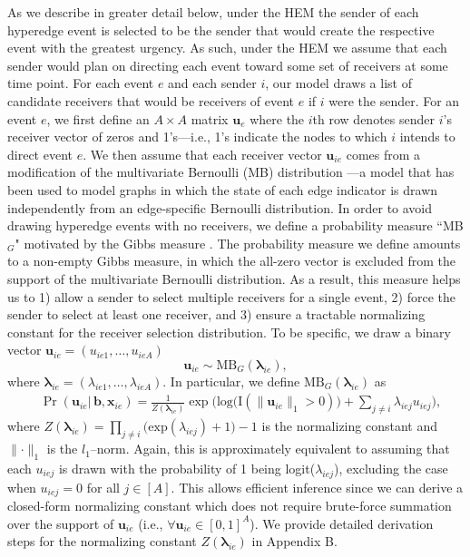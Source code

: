 \documentclass[ba]{imsart}
\numberwithin{equation}{section}
\theoremstyle{plain}
\begin{document}
	As we describe in greater detail below, under the HEM the sender of each hyperedge event is selected to be the sender that would create the respective event with the greatest urgency. As such, under the HEM we assume that each sender would plan on directing each event toward some set of receivers at some time point. For each event $e$ and each sender $i$, our model draws a list of candidate receivers that would be receivers of event $e$ if $i$ were the sender. For an event $e$, we first define an $A\times A$ matrix $\boldsymbol{u}_e$ where the $i$th row denotes sender $i$'s receiver vector of zeros and 1's---i.e., 1's indicate the nodes to which $i$ intends to direct event $e$. We then assume that each receiver vector $\boldsymbol{u}_{ie}$ comes from a modification of the multivariate Bernoulli (MB) distribution \citep{dai2013multivariate}---a model that has been used to model graphs in which the state of each edge indicator is drawn independently from an edge-specific Bernoulli distribution. In order to avoid drawing hyperedge events with no receivers, we define a probability measure ``MB$_{G}$" motivated by the Gibbs measure \citep{fellows2017removing}. The probability measure we define amounts to a non-empty Gibbs measure, in which the all-zero vector is excluded from the support of the multivariate Bernoulli distribution. As a result, this measure helps us to 1) allow a sender to select multiple receivers for a single event, 2) force the sender to select at least one receiver, and 3) ensure a tractable normalizing constant for the receiver selection distribution. To be specific, we draw a binary vector $\boldsymbol{u}_{ie}= (u_{ie1},
	\ldots, u_{ieA})$ 
	\begin{equation} \boldsymbol{u}_{ie}  \sim
		\mbox{MB}_{G}(\boldsymbol{\lambda}_{ie}),
	\end{equation}
	where $\boldsymbol{\lambda}_{ie}= (\lambda_{ie1},
	\ldots, \lambda_{ieA})$. In particular, we define $\mbox{MB}_{G}(\boldsymbol{\lambda}_{ie})$ as
	\begin{equation}
		\begin{aligned}
			&\Pr(\boldsymbol{u}_{ie}|\,\boldsymbol{b}, \boldsymbol{x}_{ie}) = \frac{1}{Z(\boldsymbol{\lambda}_{ie})}\exp\Big(\mbox{log}\big(\text{I}( \lVert \boldsymbol{u}_{ie}\rVert_1 > 0 )\big) + \sum_{j\neq i} \lambda_{iej}u_{iej}\Big) ,
		\end{aligned}
		\label{eqn:Gibbs}
	\end{equation}
	where $Z(\boldsymbol{\lambda}_{ie})= \prod_{j\neq i} \big(\mbox{exp}(\lambda_{iej}) + 1\big)-1$ is the normalizing constant and $\lVert \cdot \rVert_1$ is the $l_1$--norm. Again, this is approximately equivalent to assuming that each $u_{iej}$ is drawn with the probability of 1 being logit($\lambda_{iej}$), excluding the case when $u_{iej}=0$ for all $j \in [A]$. This allows efficient inference since we can derive a closed-form normalizing constant which does not require brute-force summation over the support of $\boldsymbol{u}_{ie}$ (i.e., $\forall \boldsymbol{u}_{ie} \in [0,1]^A$). We provide detailed derivation steps for the normalizing constant $Z(\boldsymbol{\lambda}_{ie})$ in Appendix B. 
	
\end{document}
